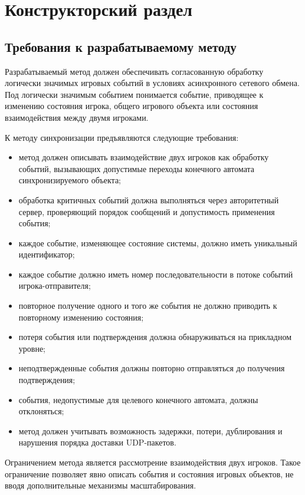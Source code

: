 ﻿\chapter{Конструкторский раздел}\label{design}

\section{Требования к разрабатываемому методу}

Разрабатываемый метод должен обеспечивать согласованную обработку логически значимых игровых событий в условиях асинхронного сетевого обмена. 
Под логически значимым событием понимается событие, приводящее к изменению состояния игрока, общего игрового объекта или состояния взаимодействия между двумя игроками.

К методу синхронизации предъявляются следующие требования:
\begin{itemize}
	\item метод должен описывать взаимодействие двух игроков как обработку событий, вызывающих допустимые переходы конечного автомата синхронизируемого объекта;
	\item обработка критичных событий должна выполняться через авторитетный сервер, проверяющий порядок сообщений и допустимость применения события;
	\item каждое событие, изменяющее состояние системы, должно иметь уникальный идентификатор;
	\item каждое событие должно иметь номер последовательности в потоке событий игрока-отправителя;
	\item повторное получение одного и того же события не должно приводить к повторному изменению состояния;
	\item потеря события или подтверждения должна обнаруживаться на прикладном уровне;
	\item неподтвержденные события должны повторно отправляться до получения подтверждения;
	\item события, недопустимые для целевого конечного автомата, должны отклоняться;
	\item метод должен учитывать возможность задержки, потери, дублирования и нарушения порядка доставки UDP-пакетов.
\end{itemize}

Ограничением метода является рассмотрение взаимодействия двух игроков. Такое ограничение позволяет явно описать события и состояния игровых объектов, 
не вводя дополнительные механизмы масштабирования.


